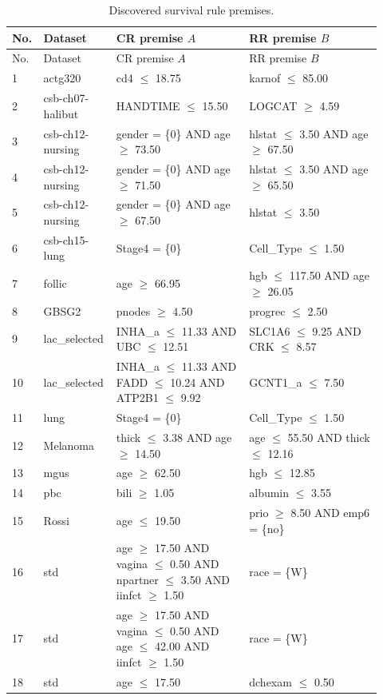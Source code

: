 \begingroup
\footnotesize
\setlength{\tabcolsep}{3pt}
\begin{longtable}{@{}p{0.04\linewidth}p{0.18\linewidth}p{0.35\linewidth}p{0.35\linewidth}@{}}
\caption{Discovered survival rule premises.}\\
\toprule
No. & Dataset & CR premise $A$ & RR premise $B$ \\
\midrule
\endfirsthead
\toprule
No. & Dataset & CR premise $A$ & RR premise $B$ \\
\midrule
\endhead
1 & actg320 & cd4 $\leq$ 18.75 & karnof $\leq$ 85.00 \\
2 & csb-ch07-halibut & HANDTIME $\leq$ 15.50 & LOGCAT $\geq$ 4.59 \\
3 & csb-ch12-nursing & gender = \{0\} AND age $\geq$ 73.50 & hlstat $\leq$ 3.50 AND age $\geq$ 67.50 \\
4 & csb-ch12-nursing & gender = \{0\} AND age $\geq$ 71.50 & hlstat $\leq$ 3.50 AND age $\geq$ 65.50 \\
5 & csb-ch12-nursing & gender = \{0\} AND age $\geq$ 67.50 & hlstat $\leq$ 3.50 \\
6 & csb-ch15-lung & Stage4 = \{0\} & Cell\_Type $\leq$ 1.50 \\
7 & follic & age $\geq$ 66.95 & hgb $\leq$ 117.50 AND age $\geq$ 26.05 \\
8 & GBSG2 & pnodes $\geq$ 4.50 & progrec $\leq$ 2.50 \\
9 & lac\_selected & INHA\_a $\leq$ 11.33 AND UBC $\leq$ 12.51 & SLC1A6 $\leq$ 9.25 AND CRK $\leq$ 8.57 \\
10 & lac\_selected & INHA\_a $\leq$ 11.33 AND FADD $\leq$ 10.24 AND ATP2B1 $\leq$ 9.92 & GCNT1\_a $\leq$ 7.50 \\
11 & lung & Stage4 = \{0\} & Cell\_Type $\leq$ 1.50 \\
12 & Melanoma & thick $\leq$ 3.38 AND age $\geq$ 14.50 & age $\leq$ 55.50 AND thick $\leq$ 12.16 \\
13 & mgus & age $\geq$ 62.50 & hgb $\leq$ 12.85 \\
14 & pbc & bili $\geq$ 1.05 & albumin $\leq$ 3.55 \\
15 & Rossi & age $\leq$ 19.50 & prio $\geq$ 8.50 AND emp6 = \{no\} \\
16 & std & age $\geq$ 17.50 AND vagina $\leq$ 0.50 AND npartner $\leq$ 3.50 AND iinfct $\geq$ 1.50 & race = \{W\} \\
17 & std & age $\geq$ 17.50 AND vagina $\leq$ 0.50 AND age $\leq$ 42.00 AND iinfct $\geq$ 1.50 & race = \{W\} \\
18 & std & age $\leq$ 17.50 & dchexam $\leq$ 0.50 \\

\end{longtable}
